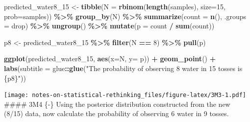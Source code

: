 \documentclass[
]{book}
\newenvironment{Shaded}{\begin{snugshade}}{\end{snugshade}}
\newcommand{\DataTypeTok}[1]{\textcolor[rgb]{0.13,0.29,0.53}{#1}}
\newcommand{\DecValTok}[1]{\textcolor[rgb]{0.00,0.00,0.81}{#1}}
\newcommand{\KeywordTok}[1]{\textcolor[rgb]{0.13,0.29,0.53}{\textbf{#1}}}
\newcommand{\NormalTok}[1]{#1}
\newcommand{\OperatorTok}[1]{\textcolor[rgb]{0.81,0.36,0.00}{\textbf{#1}}}
\newcommand{\StringTok}[1]{\textcolor[rgb]{0.31,0.60,0.02}{#1}}
\begin{document}
\begin{Shaded}
\begin{Highlighting}[]
\NormalTok{predicted\_water8\_}\DecValTok{15}\NormalTok{ \textless{}{-}}\StringTok{ }
\StringTok{  }\KeywordTok{tibble}\NormalTok{(}\DataTypeTok{N =} \KeywordTok{rbinom}\NormalTok{(}\KeywordTok{length}\NormalTok{(samples), }\DataTypeTok{size=}\DecValTok{15}\NormalTok{, }\DataTypeTok{prob=}\NormalTok{samples)) }\OperatorTok{\%\textgreater{}\%}
\StringTok{  }\KeywordTok{group\_by}\NormalTok{(N) }\OperatorTok{\%\textgreater{}\%}
\StringTok{  }\KeywordTok{summarize}\NormalTok{(}\DataTypeTok{count =} \KeywordTok{n}\NormalTok{(), }\DataTypeTok{.groups =} \StringTok{\textquotesingle{}drop\textquotesingle{}}\NormalTok{)  }\OperatorTok{\%\textgreater{}\%}
\StringTok{  }\KeywordTok{ungroup}\NormalTok{() }\OperatorTok{\%\textgreater{}\%}
\StringTok{  }\KeywordTok{mutate}\NormalTok{(}\DataTypeTok{p =}\NormalTok{ count }\OperatorTok{/}\StringTok{ }\KeywordTok{sum}\NormalTok{(count))}
  
\NormalTok{p8 \textless{}{-}}\StringTok{ }
\StringTok{  }\NormalTok{predicted\_water8\_}\DecValTok{15} \OperatorTok{\%\textgreater{}\%}
\StringTok{  }\KeywordTok{filter}\NormalTok{(N }\OperatorTok{==}\StringTok{ }\DecValTok{8}\NormalTok{) }\OperatorTok{\%\textgreater{}\%}
\StringTok{  }\KeywordTok{pull}\NormalTok{(p)}

\KeywordTok{ggplot}\NormalTok{(predicted\_water8\_}\DecValTok{15}\NormalTok{, }\KeywordTok{aes}\NormalTok{(}\DataTypeTok{x=}\NormalTok{N, }\DataTypeTok{y=}\NormalTok{ p)) }\OperatorTok{+}\StringTok{ }
\StringTok{    }\KeywordTok{geom\_point}\NormalTok{() }\OperatorTok{+}\StringTok{ }
\StringTok{  }\KeywordTok{labs}\NormalTok{(}\DataTypeTok{subtitle =}\NormalTok{ glue}\OperatorTok{::}\KeywordTok{glue}\NormalTok{(}\StringTok{"The probability of observing 8 water in 15 tosses is \{p8\}"}\NormalTok{))}
\end{Highlighting}
\end{Shaded}

\texttt{[image: notes-on-statistical-rethinking\_files/figure-latex/3M3-1.pdf]}
\#\#\#\# 3M4 \{-\}
Using the posterior distribution constructed from the new (8/15) data, now calculate the probability of observing 6 water in 9 tosses.
\end{document}
